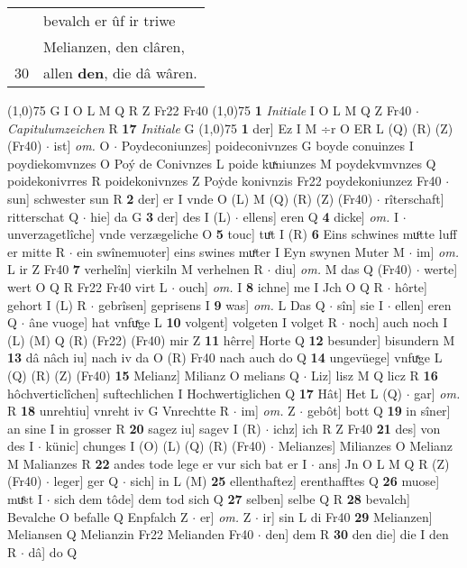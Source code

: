 \documentclass[8pt,a4paper,notitlepage]{article}
\begin{document}
\begin{table}[ht]
\begin{minipage}[t]{0.5\linewidth}
\begin{tabular}{rl}
 & bevalch er ûf ir triwe\\ 
 & Melianzen, den clâren,\\ 
30 & allen \textbf{den}, die dâ wâren.\\ 
\end{tabular}
\scriptsize
\line(1,0){75} \newline
G I O L M Q R Z Fr22 Fr40 \newline
\line(1,0){75} \newline
\textbf{1} \textit{Initiale} I O L M Q Z Fr40   $\cdot$ \textit{Capitulumzeichen} R  \textbf{17} \textit{Initiale} G  \newline
\line(1,0){75} \newline
\textbf{1} der] Ez I M ÷r O ER L (Q) (R) (Z) (Fr40)  $\cdot$ ist] \textit{om.} O  $\cdot$ Poydeconiunzes] poideconivnzes G boyde conuinzes I poydiekomvnzes O Poý de Conivnzes L poide kuͯniunzes M poydekvmvnzes Q poidekonivrres R poidekonivnzes Z Poẏde konivnzis Fr22 poydekoniunzez Fr40  $\cdot$ sun] schwester sun R \textbf{2} der] er I vnde O (L) M (Q) (R) (Z) (Fr40)  $\cdot$ rîterschaft] ritterschat Q  $\cdot$ hie] da G \textbf{3} der] des I (L)  $\cdot$ ellens] eren Q \textbf{4} dicke] \textit{om.} I  $\cdot$ unverzagetlîche] vnde verzægeliche O \textbf{5} touc] tuͤt I (R) \textbf{6} Eins schwines muͦtte luff er mitte R  $\cdot$ ein swînemuoter] eins swines muͤter I Eyn swynen Muter M  $\cdot$ im] \textit{om.} L ir Z Fr40 \textbf{7} verhelîn] vierkiln M verhelnen R  $\cdot$ diu] \textit{om.} M das Q (Fr40)  $\cdot$ werte] wert O Q R Fr22 Fr40 virt L  $\cdot$ ouch] \textit{om.} I \textbf{8} ichne] me I Jch O Q R  $\cdot$ hôrte] gehort I (L) R  $\cdot$ gebrîsen] geprisens I \textbf{9} was] \textit{om.} L Das Q  $\cdot$ sîn] sie I  $\cdot$ ellen] eren Q  $\cdot$ âne vuoge] hat vnfuͯge L \textbf{10} volgent] volgeten I volget R  $\cdot$ noch] auch noch I (L) (M) Q (R) (Fr22) (Fr40) mir Z \textbf{11} hêrre] Horte Q \textbf{12} besunder] bisundern M \textbf{13} dâ nâch iu] nach iv da O (R) Fr40 nach auch do Q \textbf{14} ungevüege] vnfuͯge L (Q) (R) (Z) (Fr40) \textbf{15} Melianz] Milianz O melians Q  $\cdot$ Liz] lisz M Q licz R \textbf{16} hôchverticlîchen] suftechlichen I Hochwertiglichen Q \textbf{17} Hât] Het L (Q)  $\cdot$ gar] \textit{om.} R \textbf{18} unrehtiu] vnreht iv G Vnrechtte R  $\cdot$ im] \textit{om.} Z  $\cdot$ gebôt] bott Q \textbf{19} in sîner] an sine I in grosser R \textbf{20} sagez iu] sagev I (R)  $\cdot$ ichz] ich R Z Fr40 \textbf{21} des] von des I  $\cdot$ künic] chunges I (O) (L) (Q) (R) (Fr40)  $\cdot$ Melianzes] Milianzes O Melianz M Malianzes R \textbf{22} andes tode lege er vur sich bat er I  $\cdot$ ans] Jn O L M Q R (Z) (Fr40)  $\cdot$ leger] ger Q  $\cdot$ sich] in L (M) \textbf{25} ellenthaftez] erenthafftes Q \textbf{26} muose] muͤst I  $\cdot$ sich dem tôde] dem tod sich Q \textbf{27} selben] selbe Q R \textbf{28} bevalch] Bevalche O befalle Q Enpfalch Z  $\cdot$ er] \textit{om.} Z  $\cdot$ ir] sin L di Fr40 \textbf{29} Melianzen] Meliansen Q Melianzin Fr22 Melianden Fr40  $\cdot$ den] dem R \textbf{30} den die] die I den R  $\cdot$ dâ] do Q \newline

\end{minipage}
\end{table}
\end{document}
